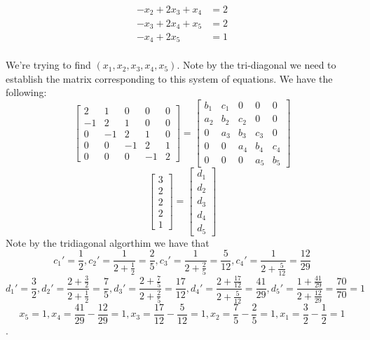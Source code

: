 \documentclass[12pt, letterpaper]{article}
\begin{document}
\begin{itemize}
\begin{align*}
	-x_2 + 2x_3 + x_4 &= 2\\
	-x_3 + 2x_4 + x_5 &= 2\\
	-x_4 + 2x_5 &= 1
	\end{align*}\\
	We're trying to find $(x_1,x_2,x_3,x_4,x_5)$.  Note by the tri-diagonal we need to establish the matrix corresponding to 
	this system of equations.  We have the following:
	$$
	\begin{bmatrix}
	2 & 1 & 0 & 0 & 0\\
	-1 & 2 & 1 & 0 & 0\\
	0 & -1 & 2 & 1 & 0\\
	0 & 0 & -1 & 2 & 1\\
	0 & 0 & 0 &  -1 & 2
	\end{bmatrix} = \begin{bmatrix}
	b_1 & c_1 & 0 & 0 & 0\\
	a_2 & b_2 & c_2 & 0 & 0\\
	0 & a_3 & b_3 & c_3 & 0\\
	0 & 0 & a_4 & b_4 & c_4\\
	0 & 0 & 0 & a_5 & b_5 
	\end{bmatrix}$$
	$$
	\begin{bmatrix}
	3\\ 2\\ 2\\ 2\\ 1
	\end{bmatrix}
	=
	\begin{bmatrix}
	d_1\\
	d_2\\
	d_3\\
	d_4\\
	d_5
	\end{bmatrix}
	$$
	Note by the tridiagonal algorthim we have that 
	$$c_1' = \frac{1}{2}, c_2' = \frac{1}{2 + \frac{1}{2}} = \frac{2}{5},
	c_3' = \frac{1}{2 + \frac{2}{5}} = \frac{5}{12}, c_4' = \frac{1}{2 + \frac{5}{12}} = \frac{12}{29}$$
	$$d_1' = \frac{3}{2}, d_2' = \frac{2 + \frac{3}{2}}{2 + \frac{1}{2}} = \frac{7}{5}, d_3' = \frac{2 + \frac{7}{5}}{2 + \frac{2}{5}} = \frac{17}{12}, d_4' = \frac{2 + \frac{17}{12}}{2 + \frac{5}{12}} = \frac{41}{29}, 
	d_5' = \frac{1 + \frac{41}{29}}{2 + \frac{12}{29}} =\frac{70}{70} = 1$$
	$$ x_5 = 1, x_4 = \frac{41}{29} - \frac{12}{29} = 1, x_3 = \frac{17}{12} - \frac{5}{12} = 1, x_2 = 
	\frac{7}{5} - \frac{2}{5} = 1, x_1 = \frac{3}{2} - \frac{1}{2} = 1$$.
	

\end{itemize}
\end{document}
